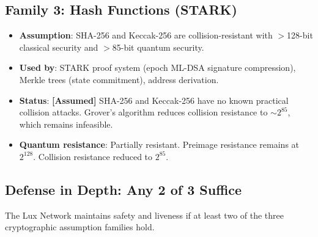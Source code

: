 \subsection{Family 3: Hash Functions (STARK)}

\begin{itemize}[leftmargin=2em]
  \item \textbf{Assumption}: SHA-256 and Keccak-256 are collision-resistant with
        $>$128-bit classical security and $>$85-bit quantum security.
  \item \textbf{Used by}: STARK proof system (epoch ML-DSA signature compression),
        Merkle trees (state commitment), address derivation.
  \item \textbf{Status}: \textbf{[Assumed]} SHA-256 and Keccak-256 have no known
        practical collision attacks. Grover's algorithm reduces collision resistance
        to $\sim 2^{85}$, which remains infeasible.
  \item \textbf{Quantum resistance}: Partially resistant. Preimage resistance remains
        at $2^{128}$. Collision resistance reduced to $2^{85}$.
\end{itemize}

\subsection{Defense in Depth: Any 2 of 3 Suffice}

\begin{theorem}
\label{thm:two-of-three}
The Lux Network maintains safety and liveness if at least two of the three
cryptographic assumption families hold.
\end{theorem}

